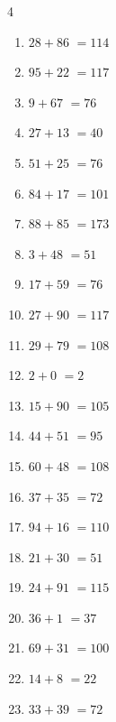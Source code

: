 \begin{multicols}{4}
\begin{enumerate}
  \item $28+86$
        $=114$

  \item $95+22$
        $=117$

  \item $9+67$
        $=76$

  \item $27+13$
        $=40$

  \item $51+25$
        $=76$

  \item $84+17$
        $=101$

  \item $88+85$
        $=173$

  \item $3+48$
        $=51$

  \item $17+59$
        $=76$

  \item $27+90$
        $=117$

  \item $29+79$
        $=108$

  \item $2+0$
        $=2$

  \item $15+90$
        $=105$

\columnbreak %

  \item $44+51$
        $=95$

  \item $60+48$
        $=108$

  \item $37+35$
        $=72$

  \item $94+16$
        $=110$

  \item $21+30$
        $=51$

  \item $24+91$
        $=115$

  \item $36+1$
        $=37$

  \item $69+31$
        $=100$

  \item $14+8$
        $=22$

  \item $33+39$
        $=72$


\end{enumerate}
\end{multicols}
